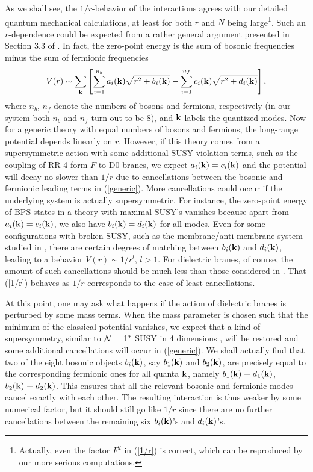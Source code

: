 \documentclass[a4paper,12pt]{article}
\begin{document}
As we shall see, the $1/r$-behavior of the interactions agrees with our detailed quantum mechanical calculations, at least for both $r$ and $N$ being large\footnote{Actually, even the factor $F^{2}$ in (\ref{1/r}) is correct, which can be reproduced by our more serious computations.}. Such an $r$-dependence could be expected from a rather general argument presented in Section 3.3 of \cite{AB}. In fact, the zero-point energy is the sum of bosonic frequencies minus the sum of fermionic frequencies
\begin{equation}
V(r)\sim\sum_{\bf k}\left[\sum_{i=1}^{n_{b}}a_{i}({\bf k})\sqrt{r^{2}+b_{i}({\bf k})}-\sum_{i=1}^{n_{f}}c_{i}({\bf k})\sqrt{r^{2}+d_{i}({\bf k})}\right],
\label{generic}
\end{equation}
where $n_{b}$, $n_{f}$ denote the numbers of bosons and fermions, respectively (in our system both $n_{b}$ and $n_{f}$ turn out to be 8), and $\bf k$ labels the quantized modes. Now for a generic theory with equal numbers of bosons and fermions, the long-range potential depends linearly on $r$. However, if this theory comes from a supersymmetric action with some additional SUSY-violation terms, such as the coupling of RR 4-form $F$ to D0-branes, we expect $a_{i}({\bf k})=c_{i}({\bf k})$ and the potential will decay no slower than $1/r$ due to cancellations between the bosonic and fermionic leading terms in (\ref{generic}). More cancellations could occur if the underlying system is actually supersymmetric. For instance, the zero-point energy of BPS states in a theory with maximal SUSY's vanishes because apart from $a_{i}({\bf k})=c_{i}({\bf k})$, we also have $b_{i}({\bf k})=d_{i}({\bf k})$ for all modes. Even for some configurations with broken SUSY, such as the membrane/anti-membrane system studied in \cite{AB}, there are certain degrees of matching between $b_{i}({\bf k})$ and $d_{i}({\bf k})$, leading to a behavior $V(r)\sim 1/r^{l}$, $l > 1$. For dielectric branes, of course, the amount of such cancellations should be much less than those considered in \cite{AB}. That (\ref{1/r}) behaves as $1/r$ corresponds to the case of least cancellations.

At this point, one may ask what happens if the action of dielectric branes is perturbed by some mass terms. When the mass parameter is chosen such that the minimum of the classical potential vanishes, we expect that a kind of supersymmetry, similar to ${\cal N}=1^{*}$ SUSY in 4 dimensions \cite{PS}, will be restored and some additional cancellations will occur in (\ref{generic}). We shall actually find that two of the eight bosonic objects $b_{i}({\bf k})$, say $b_{1}({\bf k})$ and $b_{2}({\bf k})$, are precisely equal to the corresponding fermionic ones for all quanta $\bf k$, namely $b_{1}({\bf k})\equiv d_{1}({\bf k})$, $b_{2}({\bf k})\equiv d_{2}({\bf k})$. This ensures that all the relevant bosonic and fermionic modes cancel exactly with each other. The resulting interaction is thus weaker by some numerical factor, but it should still go like $1/r$ since there are no further cancellations between the remaining six $b_{i}({\bf k})$'s and $d_{i}({\bf k})$'s.
\end{document}
